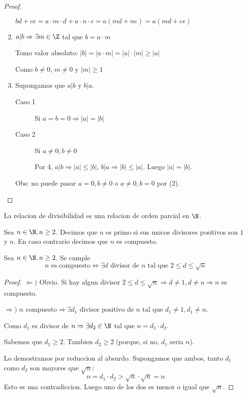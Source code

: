 \begin{proof}
\begin{enumerate}
		      \(bd + ce = a \cdot m \cdot d + a \cdot n \cdot e = a (md + ne) = a (md + ce )\)

		\item \(a|b \Rightarrow \exists m \in \Z \) tal que \(b = a \cdot m \)

		      Tomo valor absoluto: \(|b| = |a \cdot m| = |a| \cdot |m| \geq |a|\)

		      Como \(b \neq 0\), \(m \neq 0 \) y \(|m| \geq  1	\)

		\item Supongamos que \(a|b \) y \(b|a \).
		      \begin{description}
			      \item[Caso 1] Si \(a = b = 0 \Rightarrow |a| = |b|\)
			      \item[Caso 2] Si \(a \neq 0, b \neq 0\)

				      Por 4, \(a|b \Rightarrow |a| \leq |b| \), \(b|a \Rightarrow |b| \leq |a| \). Luego \(|a| = |b|\).

		      \end{description}
		      Obs: no puede pasar \(a = 0, b \neq 0 \) o \(a \neq 0, b = 0 \) por (2).
	\end{enumerate}
\end{proof}

\begin{corollary}
	La relacion de divisibilidad es una relacion de orden parcial en \(\N \).
\end{corollary}

\begin{definition}
	Sea \(n \in \N, n \geq  2 \). Decimos que \(n \) es primo si sus unicos divisores positivos son \(1 \) y \(n \). En caso contrario decimos que \(n \) es compuesto.
\end{definition}

\begin{theorem}
	Sea \(n \in \N, n \geq 2 \). Se cumple
	\[
		n \text{ es compuesto} \iff  \exists d \text{ divisor de } n \text{ tal que } 2 \leq d \leq \sqrt{n }
	\]
\end{theorem}
\begin{proof}
	\(\Leftarrow )\) Obvio. Si hay algun divisor \(2 \leq d \leq \sqrt{n } \Rightarrow d \neq 1, d \neq n \Rightarrow n\) es compuesto.

	\(\Rightarrow ) \) \(n \text{ compuesto} \Rightarrow \exists d_1 \text{ divisor positivo de } n \text{ tal que } d_1 \neq 1, d_1 \neq n\).

	Como \(d_1 \) es divisor de \(n \Rightarrow \exists d_2 \in \N \) tal que \(n = d_1 \cdot d_2 \).

	Sabemos que \(d_1 \geq  2 \). Tambien \(d_2 \geq  2\) (porque, si no, \(d_1 \) seria \(n\)).

	Lo demostramos por reduccion al absurdo. Supongamos que ambos, tanto \(d_1 \) como \(d_2 \) son mayores que \(\sqrt{n } \):
	\[
		n = d_1 \cdot d_2 > \sqrt{n} \cdot \sqrt{n} = n
	\]
	Esto es una contradiccion. Luego uno de los dos es menor o igual que \(\sqrt{n }\).
\end{proof}

